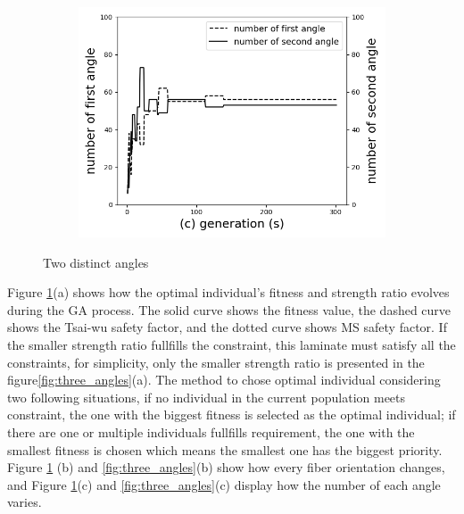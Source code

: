 \begin{figure}[!htb]
		\begin{subfigure}[b]{0.8\linewidth}
			\includegraphics[width=\linewidth]{Figures/chapter3/part2/image/two_distinct_angler_number_change.png}
		\end{subfigure}
	\caption{Two distinct angles}
	\label{fig:two_angles}
\end{figure}




Figure \ref{fig:two_angles}(a) shows how the optimal individual's fitness and
strength ratio evolves during the GA process. The solid curve shows the fitness
value, the dashed curve shows the Tsai-wu safety factor, and the dotted curve
shows MS safety factor. If the smaller strength ratio fullfills the constraint,
this laminate must satisfy all the constraints, for simplicity, only the smaller
strength ratio is presented in the figure\ref{fig:three_angles}(a). The method
to chose optimal individual considering two following situations, if no
individual in the current population meets constraint, the one with the biggest
fitness is selected as the optimal individual; if there are one or multiple
individuals fullfills requirement, the one with the smallest fitness is chosen which
means the smallest one has the biggest priority.  Figure \ref{fig:two_angles}
(b) and \ref{fig:three_angles}(b) show how every fiber orientation changes, and
Figure \ref{fig:two_angles}(c) and \ref{fig:three_angles}(c) display how the
number of each angle varies.

